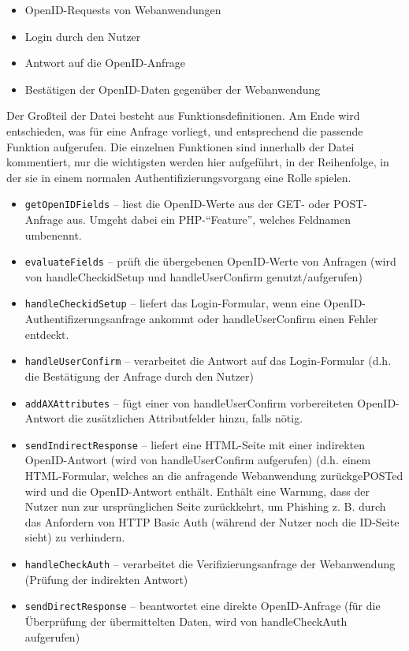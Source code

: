 \begin{itemize}
	\item OpenID-Requests von Webanwendungen
	\item Login durch den Nutzer
	\item Antwort auf die OpenID-Anfrage
	\item Bestätigen der OpenID-Daten gegenüber der Webanwendung
\end{itemize}

Der Großteil der Datei besteht aus Funktionsdefinitionen.
Am Ende wird entschieden, was für eine Anfrage vorliegt, und entsprechend die passende Funktion aufgerufen.
Die einzelnen Funktionen sind innerhalb der Datei kommentiert, nur die wichtigsten werden hier aufgeführt,
in der Reihenfolge, in der sie in einem normalen Authentifizierungsvorgang eine Rolle spielen.

\begin{itemize}
	\item \texttt{getOpenIDFields} -- liest die OpenID-Werte aus der GET- oder POST-Anfrage aus. Umgeht dabei ein PHP-"`Feature"', welches Feldnamen umbenennt.
	\item \texttt{evaluateFields} -- prüft die übergebenen OpenID-Werte von Anfragen (wird von handleCheckidSetup und handleUserConfirm genutzt/aufgerufen)
	\item \texttt{handleCheckidSetup} -- liefert das Login-Formular, wenn eine OpenID-Authentifizerungsanfrage ankommt oder handleUserConfirm einen Fehler entdeckt.
	\item \texttt{handleUserConfirm} -- verarbeitet die Antwort auf das Login-Formular (d.h. die Bestätigung der Anfrage durch den Nutzer)
	\item \texttt{addAXAttributes} -- fügt einer von handleUserConfirm vorbereiteten OpenID-Antwort die zusätzlichen Attributfelder hinzu, falls nötig.
	\item \texttt{sendIndirectResponse} -- liefert eine HTML-Seite mit einer indirekten OpenID-Antwort (wird von handleUserConfirm aufgerufen)
											(d.h. einem HTML-Formular, welches an die anfragende Webanwendung zurückgePOSTed wird und die OpenID-Antwort enthält.
											Enthält eine Warnung, dass der Nutzer nun zur ursprünglichen Seite zurückkehrt,
											um Phishing z. B. durch das Anfordern von HTTP Basic Auth (während der Nutzer noch die ID-Seite sieht) zu verhindern.
	\item \texttt{handleCheckAuth} -- verarbeitet die Verifizierungsanfrage der Webanwendung (Prüfung der indirekten Antwort)
	\item \texttt{sendDirectResponse} -- beantwortet eine direkte OpenID-Anfrage (für die Überprüfung der übermittelten Daten, wird von handleCheckAuth aufgerufen)
\end{itemize}



